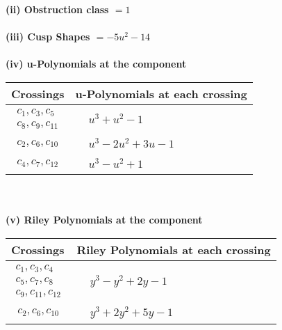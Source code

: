 \documentclass[1p]{elsarticle_modified}
\theoremstyle{definition}
\begin{document}
\flushleft \textbf{(ii) Obstruction class $= 1$}\\~\\
\flushleft \textbf{(iii) Cusp Shapes $= -5 u^2-14$}\\~\\
\newpage\renewcommand{\arraystretch}{1}
\flushleft \textbf{(iv) u-Polynomials at the component}\newline \\
\begin{tabular}{m{50pt}|m{274pt}}
Crossings & \hspace{64pt}u-Polynomials at each crossing \\
\hline $$\begin{aligned}c_{1},c_{3},c_{5}\\c_{8},c_{9},c_{11}\end{aligned}$$&$\begin{aligned}
&u^3+u^2-1
\end{aligned}$\\
\hline $$\begin{aligned}c_{2},c_{6},c_{10}\end{aligned}$$&$\begin{aligned}
&u^3-2 u^2+3 u-1
\end{aligned}$\\
\hline $$\begin{aligned}c_{4},c_{7},c_{12}\end{aligned}$$&$\begin{aligned}
&u^3- u^2+1
\end{aligned}$\\
\hline
\end{tabular}\\~\\
\newpage\renewcommand{\arraystretch}{1}
\flushleft \textbf{(v) Riley Polynomials at the component}\newline \\
\begin{tabular}{m{50pt}|m{274pt}}
Crossings & \hspace{64pt}Riley Polynomials at each crossing \\
\hline $$\begin{aligned}c_{1},c_{3},c_{4}\\c_{5},c_{7},c_{8}\\c_{9},c_{11},c_{12}\end{aligned}$$&$\begin{aligned}
&y^3- y^2+2 y-1
\end{aligned}$\\
\hline $$\begin{aligned}c_{2},c_{6},c_{10}\end{aligned}$$&$\begin{aligned}
&y^3+2 y^2+5 y-1
\end{aligned}$\\
\hline
\end{tabular}\\~\\
\end{document}
